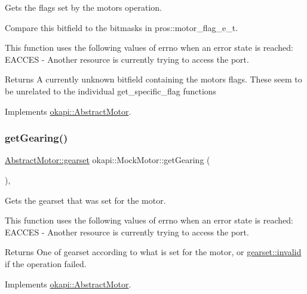 Gets the flags set by the motor\textquotesingle{}s operation. 

Compare this bitfield to the bitmasks in pros\+::motor\+\_\+flag\+\_\+e\+\_\+t.

This function uses the following values of errno when an error state is reached\+: E\+A\+C\+C\+ES -\/ Another resource is currently trying to access the port.

\begin{DoxyReturn}{Returns}
A currently unknown bitfield containing the motor\textquotesingle{}s flags. These seem to be unrelated to the individual get\+\_\+specific\+\_\+flag functions 
\end{DoxyReturn}


Implements \mbox{\hyperlink{classokapi_1_1AbstractMotor_aaae44487bf20ac2e18b52ee57b7a06ad}{okapi\+::\+Abstract\+Motor}}.

\mbox{\label{classokapi_1_1MockMotor_aa4ba179d8b028075dce41a08a258339f}} 
\subsubsection{\texorpdfstring{getGearing()}{getGearing()}}
{\footnotesize\ttfamily \mbox{\hyperlink{classokapi_1_1AbstractMotor_a88aaa6ea2fa10f5520a537bbf26774d5}{Abstract\+Motor\+::gearset}} okapi\+::\+Mock\+Motor\+::get\+Gearing (\begin{DoxyParamCaption}{ }\end{DoxyParamCaption})\hspace{0.3cm}{\ttfamily [override]}, {\ttfamily [virtual]}}



Gets the gearset that was set for the motor. 

This function uses the following values of errno when an error state is reached\+: E\+A\+C\+C\+ES -\/ Another resource is currently trying to access the port.

\begin{DoxyReturn}{Returns}
One of gearset according to what is set for the motor, or \mbox{\hyperlink{classokapi_1_1AbstractMotor_a88aaa6ea2fa10f5520a537bbf26774d5afedb2d84cafe20862cb4399751a8a7e3}{gearset\+::invalid}} if the operation failed. 
\end{DoxyReturn}


Implements \mbox{\hyperlink{classokapi_1_1AbstractMotor_adc90f1fc8af6c34c4e833355693474bb}{okapi\+::\+Abstract\+Motor}}.

